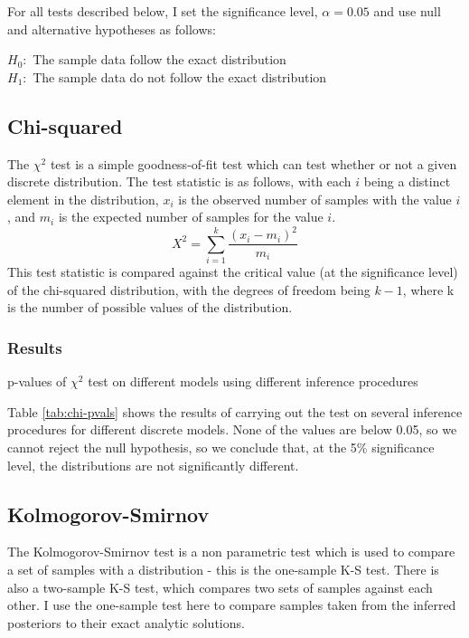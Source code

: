 For all tests described below, I set the significance level, $\alpha = 0.05$ and use null and alternative hypotheses as follows:

$H_0:$ The sample data follow the exact distribution\\
$H_1:$ The sample data do not follow the exact distribution

\subsection{Chi-squared}

The $\chi^2$ test is a simple goodness-of-fit test which can test whether or not a given discrete distribution. The test statistic is as follows, with each $i$ being a distinct element in the distribution, $x_i$ is the observed number of samples with the value $i$, and $m_i$ is the expected number of samples for the value $i$.
% 
\[X^{2}=\sum _{i=1}^{k}{\frac {(x_{i}-m_{i})^{2}}{m_{i}}}\]
% 
This test statistic is compared against the critical value (at the significance level) of the chi-squared distribution, with the degrees of freedom being $k-1$, where k is the number of possible values of the distribution.
\subsubsection{Results}
\begin{table}[!ht]
	\centering
	\caption{p-values of $\chi^2$ test on different models using different inference procedures}
	\label{tab:chi-pvals}
\end{table}

Table \ref{tab:chi-pvals} shows the results of carrying out the test on several inference procedures for different discrete models. None of the values are below 0.05, so we cannot reject the null hypothesis, so we conclude that, at the 5\% significance level, the distributions are not significantly different.

\subsection{Kolmogorov-Smirnov}

The Kolmogorov-Smirnov test is a non parametric test which is used to compare a set of samples with a distribution - this is the one-sample K-S test. There is also a two-sample K-S test, which compares two sets of samples against each other. I use the one-sample test here to compare samples taken from the inferred posteriors to their exact analytic solutions.

